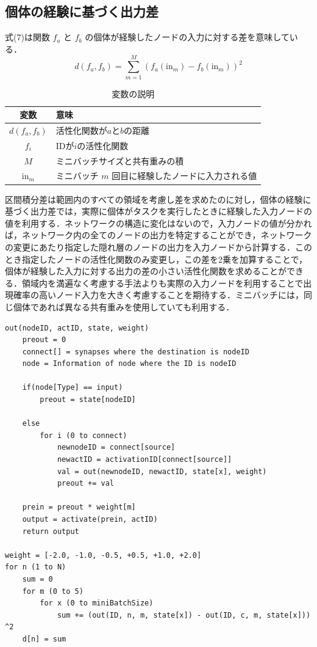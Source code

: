\subsection{個体の経験に基づく出力差}
式(7)は関数 $ f_a $ と $ f_b $ の個体が経験したノードの入力に対する差を意味している．
\begin{equation}
    d(f_{a}, f_{b}) = \sum_{m=1}^{M}(f_{a}(\text{in}_{m}) - f_{b}(\text{in}_{m}))^2
\end{equation}

\begin{table}[H]
    \caption{変数の説明}
    \centering
    \begin{tabular}{cl}
        \hline
        変数  & 意味 \\
        \hline \hline
        $d(f_{a}, f_{b})$ & 活性化関数が$a$と$b$の距離                 \\
        $f_{i}$           & IDが$i$の活性化関数                        \\
        $M$               & ミニバッチサイズと共有重みの積             \\
        $\text{in}_m$     & ミニバッチ $m$ 回目に経験したノードに入力される値 \\
        \hline
    \end{tabular}
\end{table}

区間積分差は範囲内のすべての領域を考慮し差を求めたのに対し，個体の経験に基づく出力差では，実際に個体がタスクを実行したときに経験した入力ノードの値を利用する．ネットワークの構造に変化はないので，入力ノードの値が分かれば，ネットワーク内の全てのノードの出力を特定することができ，ネットワークの変更にあたり指定した隠れ層のノードの出力を入力ノードから計算する．このとき指定したノードの活性化関数のみ変更し，この差を2乗を加算することで，個体が経験した入力に対する出力の差の小さい活性化関数を求めることができる．領域内を満遍なく考慮する手法よりも実際の入力ノードを利用することで出現確率の高いノード入力を大きく考慮することを期待する．ミニバッチには，同じ個体であれば異なる共有重みを使用していても利用する．

\begin{lstlisting}[caption=経験入力に基づく出力差のプログラム]
out(nodeID, actID, state, weight)
    preout = 0
    connect[] = synapses where the destination is nodeID
    node = Information of node where the ID is nodeID

    if(node[Type] == input)
        preout = state[nodeID]
    
    else
        for i (0 to connect)
            newnodeID = connect[source]
            newactID = activationID[connect[source]]
            val = out(newnodeID, newactID, state[x], weight)
            preout += val
    
    prein = preout * weight[m]
    output = activate(prein, actID)
    return output

weight = [-2.0, -1.0, -0.5, +0.5, +1.0, +2.0]
for n (1 to N)
    sum = 0
    for m (0 to 5)
        for x (0 to miniBatchSize)
            sum += (out(ID, n, m, state[x]) - out(ID, c, m, state[x])) ^2
    d[n] = sum
\end{lstlisting}

